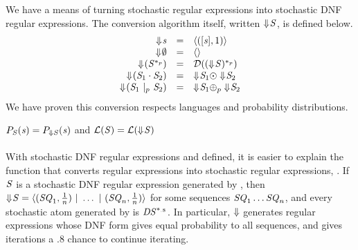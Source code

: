 \documentclass[acmsmall,screen,anonymous]{acmart}
\begin{document}
We have a means of turning stochastic regular expressions into stochastic DNF
regular expressions. The conversion algorithm itself, written
$\Downarrow\mkern-4mu \mathit{S}$, is defined below.
\[
  \begin{array}{rcl}
    \ToDNFRegexOf{\String} & = & \DNFOf{(\SequenceOf{\String},1)}\\
    \ToDNFRegexOf{\emptyset} & = & \DNFOf{}\\
    \ToDNFRegexOf{(\PRegexStar{\Regex}{\Probability})} & = & \AtomToDNFOf{\PRegexStar{(\ToDNFRegexOf{\Regex})}{\Probability}}\\
    \ToDNFRegexOf{(\RegexConcat{\Regex_1}{\Regex_2})} & = & \ToDNFRegexOf{\Regex_1} \ConcatDNF \ToDNFRegexOf{\Regex_2}\\
    \ToDNFRegexOf{(\PRegexOr{\Regex_1}{\Regex_2}{\Probability})} & = & \ToDNFRegexOf{\Regex_1} \OrDNF_{\Probability} \ToDNFRegexOf{\Regex_2}\\
  \end{array}
\]
We have proven this conversion respects languages and probability distributions.

\begin{theorem}
  $P_{\mathit{S}}(\mathit{s}) = P_{\Downarrow
    \mathit{S}}(\mathit{s})$ and $\mathcal{L}(\mathit{S}) =
  \mathcal{L}(\Downarrow\mkern-4mu \mathit{S})$
\end{theorem}

\paragraph*{\ToStochastic} With stochastic DNF regular expressions and
\ToDNFRegex defined, it is easier to explain the function that converts regular
expressions into stochastic regular expressions, \ToStochastic. If $\mathit{S}$ is a
stochastic DNF regular expression generated by \ToStochastic, then
$\Downarrow\mkern-4mu \mathit{S} = \langle(\mathit{SQ}_1,\frac{1}{n}) ~|~ \ldots ~|~
  (\mathit{SQ}_n,\frac{1}{n})\rangle$ for some sequences $\mathit{SQ}_1\ldots\mathit{SQ}_n$,
and every stochastic atom generated by \ToStochastic is
$\mathit{DS}^{*_{.8}}$. In particular, $\Downarrow$ generates regular
expressions whose DNF form gives equal probability to all sequences, and gives
iterations a .8 chance to continue iterating.
\end{document}
